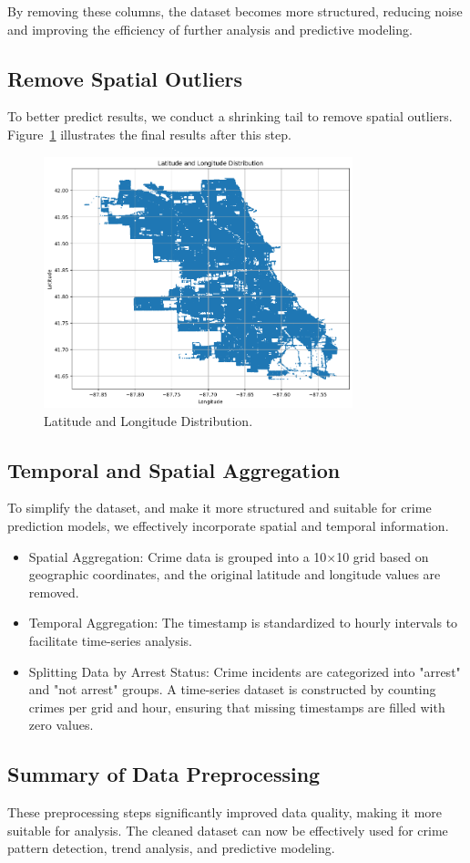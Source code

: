 \documentclass[11pt]{article}
\begin{document}
By removing these columns, the dataset becomes more structured, reducing noise and improving the efficiency of further analysis and predictive modeling.

\subsection{Remove Spatial Outliers}
\label{subsec:remove_spatial_outliers}
To better predict results, we conduct a shrinking tail to remove spatial outliers. Figure~\ref{fig:spatial_distribution}  illustrates the final results after this step. 

\begin{figure}[htbp]
    \centering
    \includegraphics[width=0.8\textwidth]{spatial_distribution.png}
    \caption{Latitude and Longitude Distribution.}
    \label{fig:spatial_distribution}
\end{figure}

\subsection{Temporal and Spatial Aggregation}
\label{subsec:temporal_and_saptial_aggregation}
To simplify the dataset, and make it more structured and suitable for crime prediction models, we effectively incorporate spatial and temporal information.

\begin{itemize}
    \item Spatial Aggregation: Crime data is grouped into a 10×10 grid based on geographic coordinates, and the original latitude and longitude values are removed.
    \item Temporal Aggregation: The timestamp is standardized to hourly intervals to facilitate time-series analysis.
    \item Splitting Data by Arrest Status: Crime incidents are categorized into "arrest" and "not arrest" groups. A time-series dataset is constructed by counting crimes per grid and hour, ensuring that missing timestamps are filled with zero values.

\end{itemize}

\subsection{Summary of Data Preprocessing}
\label{subsec:preprocessing_summary}
These preprocessing steps significantly improved data quality, making it more suitable for analysis. The cleaned dataset can now be effectively used for crime pattern detection, trend analysis, and predictive modeling.
\end{document}
